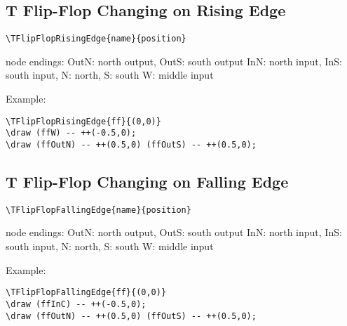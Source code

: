 \documentclass[parskip=full]{scrartcl}
\begin{document}
\subsection{T Flip-Flop Changing on Rising Edge}

\begin{verbatim}
\TFlipFlopRisingEdge{name}{position}
\end{verbatim}
node endings: OutN: north output, OutS: south output
              InN: north input, InS: south input,
              N: north, S: south
              W: middle input

Example:\\
\begin{minipage}{0.8\textwidth}
\begin{verbatim}
\TFlipFlopRisingEdge{ff}{(0,0)}
\draw (ffW) -- ++(-0.5,0);
\draw (ffOutN) -- ++(0.5,0) (ffOutS) -- ++(0.5,0);
\end{verbatim}
\end{minipage}
\begin{minipage}{0.19\textwidth}
\end{minipage}

\subsection{T Flip-Flop Changing on Falling Edge}

\begin{verbatim}
\TFlipFlopFallingEdge{name}{position}
\end{verbatim}
node endings: OutN: north output, OutS: south output
              InN: north input, InS: south input,
              N: north, S: south
              W: middle input

Example:\\
\begin{minipage}{0.8\textwidth}
\begin{verbatim}
\TFlipFlopFallingEdge{ff}{(0,0)}
\draw (ffInC) -- ++(-0.5,0);
\draw (ffOutN) -- ++(0.5,0) (ffOutS) -- ++(0.5,0);
\end{verbatim}
\end{minipage}
\begin{minipage}{0.19\textwidth}
\end{minipage}
\end{document}
